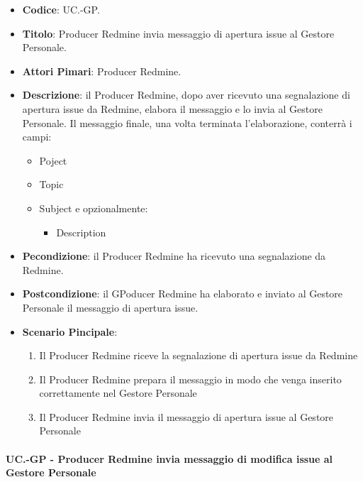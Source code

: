	\begin{itemize}
		\item \textbf{Codice}: UC\theuccount.\thesubuccount-GP.
		\item \textbf{Titolo}: Producer Redmine invia messaggio di apertura issue al Gestore Personale.
		\item \textbf{Attori Pimari}: Producer Redmine.
		\item \textbf{Descrizione}: il Producer Redmine, dopo aver
		ricevuto una segnalazione di apertura issue da Redmine, elabora il messaggio e lo invia al Gestore Personale.
		Il messaggio finale, una volta terminata l'elaborazione, conterrà i campi:
		\begin{itemize}
			\item Poject
			\item Topic
			\item Subject e opzionalmente:
			\begin{itemize}
				\item Description
			\end{itemize}
		\end{itemize}
		\item \textbf{Pecondizione}: il Producer Redmine ha ricevuto una segnalazione da Redmine.
		\item \textbf{Postcondizione}: il GPoducer Redmine ha elaborato e inviato al Gestore Personale il messaggio di apertura issue.
		\item \textbf{Scenario Pincipale}: 
		\begin{enumerate}
			\item Il Producer Redmine riceve la segnalazione di apertura issue da Redmine
			\item Il Producer Redmine prepara il messaggio in modo che venga inserito correttamente nel Gestore Personale
			\item Il Producer Redmine invia il messaggio di
			apertura issue al Gestore Personale
		\end{enumerate}
		
	\end{itemize}
	
	\paragraph{UC\theuccount.\thesubuccount-GP - Producer Redmine invia messaggio di modifica issue al Gestore Personale}
		
